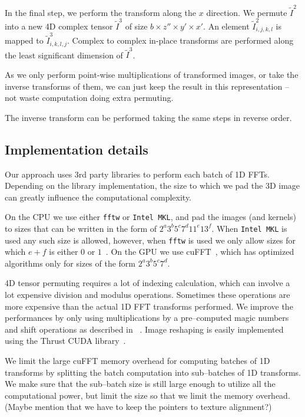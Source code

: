 \documentclass[conference]{./IEEEtran/IEEEtran}
\begin{document}
  In the final step, we perform the transform along the $x$ direction.
  We permute $\widetilde{I}^2$ into a new 4D complex tensor
  $\widetilde{I}^3$ of size $b \times z'' \times y' \times x'$.  An
  element $\widetilde{I}^2_{i,j,k,l}$ is mapped to
  $\widetilde{I}^3_{i,k,l,j}$.  Complex to complex in-place transforms
  are performed along the least significant dimension of
  $\widetilde{I}^3$.

  As we only perform point-wise multiplications of transformed images,
  or take the inverse transforms of them, we can just keep the result
  in this representation -- not waste computation doing extra
  permuting.

  The inverse transform can be performed taking the same steps in
  reverse order.

  \subsection{Implementation details}

Our approach uses $3$rd party libraries to perform each batch of 1D
  FFTs.  Depending on the library implementation, the size to which we
  pad the 3D image can greatly influence the computational complexity.

  On the CPU we use either {\tt fftw} or {\tt Intel MKL}, and pad the
  images (and kernels) to sizes that can be written in the form of
  $2^a3^b5^c7^d11^e13^f$.  When {\tt Intel MKL} is used any such size
  is allowed, however, when {\tt fftw} is used we only allow sizes for
  which $e+f$ is either $0$ or $1$~\cite{frigo1999fftw,frigo1998fftw}.
  On the GPU we use cuFFT~\cite{nvidia2010cufft}, which has optimized
  algorithms only for sizes of the form $2^a3^b5^c7^d$.

4D tensor permuting requires a lot of
  indexing calculation, which can involve a lot expensive division and
  modulus operations.  Sometimes these operations are more expensive
  than the actual 1D FFT transforms performed.  We improve the
  performances by only using multiplications by a pre--computed magic
  numbers and shift operations as described in
  ~\cite{warren2013hacker}.  Image reshaping is easily implemented
  using the Thrust CUDA library~\cite{bell2011thrust}.

  We limit the large cuFFT memory overhead for computing batches of 1D
  transforms by splitting the batch computation into sub--batches of
  1D transforms.  We make sure that the sub--batch size is still large
  enough to utilize all the computational power, but limit the size so
  that we limit the memory overhead.  (Maybe mention that we have to
  keep the pointers to texture alignment?)
\end{document}
